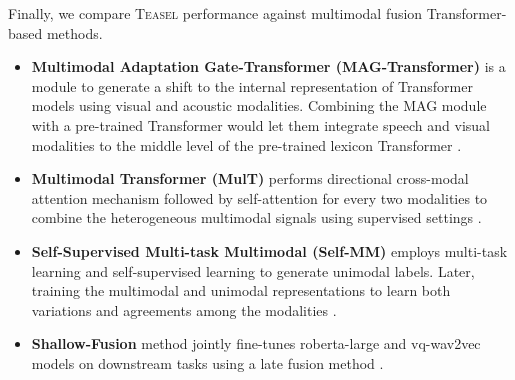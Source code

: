 \documentclass[letterpaper]{article} \usepackage{spconf,amsmath,graphicx}
\newcommand{\teasel}{\textsc{Teasel }}
\begin{document}
Finally, we compare \teasel performance against multimodal fusion Transformer-based methods.
\begin{itemize}
    \item \textbf{Multimodal Adaptation Gate-Transformer (MAG-Transformer)}
      is a module to generate a shift to the internal representation of Transformer models using visual and acoustic modalities. Combining the MAG module with a pre-trained Transformer would let them integrate speech and visual modalities to the middle level of the pre-trained lexicon Transformer \cite{rahman2020integrating}.
      
    \item \textbf{Multimodal Transformer (MulT)} performs directional cross-modal attention mechanism followed by self-attention for every two modalities to combine the heterogeneous multimodal signals using supervised settings \cite{tsai2019MULT}.
    
    \item \textbf{Self-Supervised Multi-task Multimodal (Self-MM)} employs multi-task learning and self-supervised learning to generate unimodal labels. Later, training the multimodal and unimodal representations to learn both variations and agreements among the modalities \cite{yu2021le}.
        
    \item \textbf{Shallow-Fusion} method jointly fine-tunes roberta-large and vq-wav2vec models on downstream tasks using a late fusion method \cite{siriwardhana2020jointly} .
\end{itemize}
\end{document}
